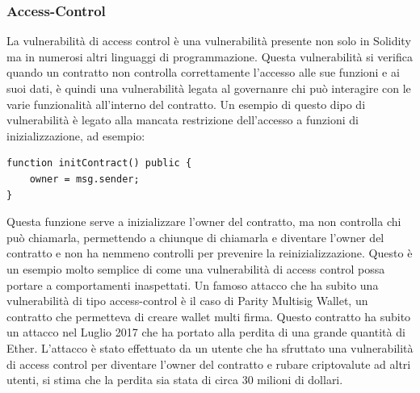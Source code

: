 \documentclass[../../Thesis.tex]{subfiles}
\begin{document}
\subsubsection{Access-Control}
La vulnerabilità di access control è una vulnerabilità presente non solo in Solidity ma in numerosi altri linguaggi di programmazione. Questa vulnerabilità si verifica quando un contratto non controlla correttamente l'accesso alle sue funzioni e ai suoi dati, è quindi una vulnerabilità legata al governanre chi può interagire con le varie funzionalità all'interno del contratto. Un esempio di questo dipo di vulnerabilità è legato alla mancata restrizione dell'accesso a funzioni di inizializzazione, ad esempio:
\begin{lstlisting}[language=Solidity]
function initContract() public {
    owner = msg.sender;
}
\end{lstlisting} 
Questa funzione serve a inizializzare l'owner del contratto, ma non controlla chi può chiamarla, permettendo a chiunque di chiamarla e diventare l'owner del contratto e non ha nemmeno controlli per prevenire la reinizializzazione. Questo è un esempio molto semplice di come una vulnerabilità di access control possa portare a comportamenti inaspettati. 
Un famoso attacco che ha subito una vulnerabilità di tipo access-control è il caso di Parity Multisig Wallet, un contratto che permetteva di creare wallet multi firma. Questo contratto ha subito un attacco nel Luglio 2017 che ha portato alla perdita di una grande quantità di Ether. L'attacco è stato effettuato da un utente che ha sfruttato una vulnerabilità di access control per diventare l'owner del contratto e rubare criptovalute ad altri utenti, si stima che la perdita sia stata di circa 30 milioni di dollari.
\end{document}
